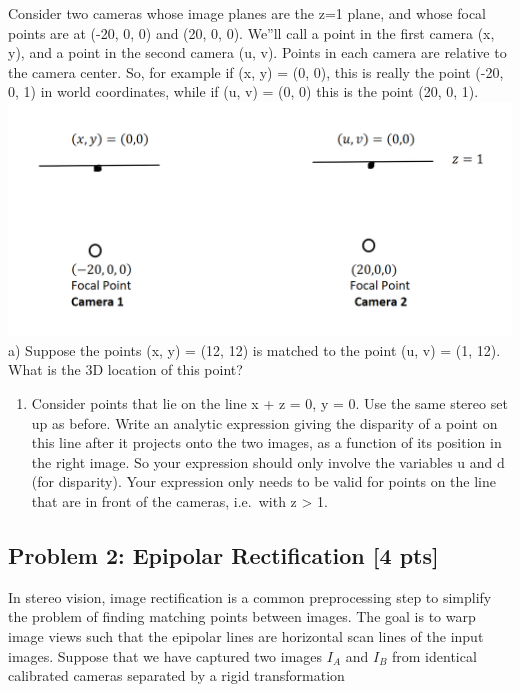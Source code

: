 \documentclass[11pt]{article}
\makeatletter
\def\maxwidth{\ifdim\Gin@nat@width>\linewidth\linewidth
    \else\Gin@nat@width\fi}
\let\Oldincludegraphics\includegraphics
\renewcommand{\includegraphics}[1]{\Oldincludegraphics[width=.8\maxwidth]{#1}}
\providecommand{\tightlist}{%
      \setlength{\itemsep}{0pt}\setlength{\parskip}{0pt}}
\makeatother
\begin{document}
Consider two cameras whose image planes are the z=1 plane, and whose
focal points are at (-20, 0, 0) and (20, 0, 0). We''ll call a point in
the first camera (x, y), and a point in the second camera (u, v). Points
in each camera are relative to the camera center. So, for example if (x,
y) = (0, 0), this is really the point (-20, 0, 1) in world coordinates,
while if (u, v) = (0, 0) this is the point (20, 0,
1).\includegraphics{fig/fig1.png} a) Suppose the points (x, y) = (12,
12) is matched to the point (u, v) = (1, 12). What is the 3D location of
this point?

\begin{enumerate}
\def\labelenumi{\alph{enumi})}
\setcounter{enumi}{1}
\tightlist
\item
  Consider points that lie on the line x + z = 0, y = 0. Use the same
  stereo set up as before. Write an analytic expression giving the
  disparity of a point on this line after it projects onto the two
  images, as a function of its position in the right image. So your
  expression should only involve the variables u and d (for disparity).
  Your expression only needs to be valid for points on the line that are
  in front of the cameras, i.e.~with z \textgreater{} 1.
\end{enumerate}

    \hypertarget{problem-2-epipolar-rectification-4-pts}{%
\subsection{Problem 2: Epipolar Rectification {[}4
pts{]}}\label{problem-2-epipolar-rectification-4-pts}}

In stereo vision, image rectification is a common preprocessing step to
simplify the problem of finding matching points between images. The goal
is to warp image views such that the epipolar lines are horizontal scan
lines of the input images. Suppose that we have captured two images
\(I_A\) and \(I_B\) from identical calibrated cameras separated by a
rigid transformation
\end{document}
